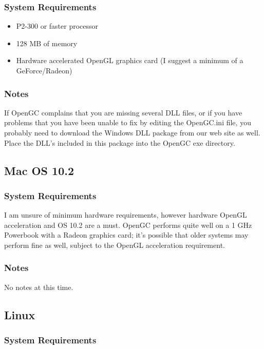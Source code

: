\documentclass[11pt]{article}
\begin{document}
\subsubsection{System Requirements}
\begin{itemize}
\item P2-300 or faster processor
\item 128 MB of memory
\item Hardware accelerated OpenGL graphics card (I suggest a minimum of a GeForce/Radeon)
\end{itemize}

\subsubsection{Notes}

If OpenGC complains that you are missing several DLL files, or if you have problems that you have been unable to fix by editing the OpenGC.ini file, you probably need to download the Windows DLL package from our web site as well. Place the DLL's included in this package into the OpenGC exe directory.

\subsection{Mac OS 10.2}

\subsubsection{System Requirements}

I am unsure of minimum hardware requirements, however hardware OpenGL acceleration and OS 10.2 are a must. OpenGC performs quite well on a 1 GHz Powerbook with a Radeon graphics card; it's possible that older systems may perform fine as well, subject to the OpenGL acceleration requirement.

\subsubsection{Notes}

No notes at this time.

\subsection{Linux}

\subsubsection{System Requirements}
\end{document}
